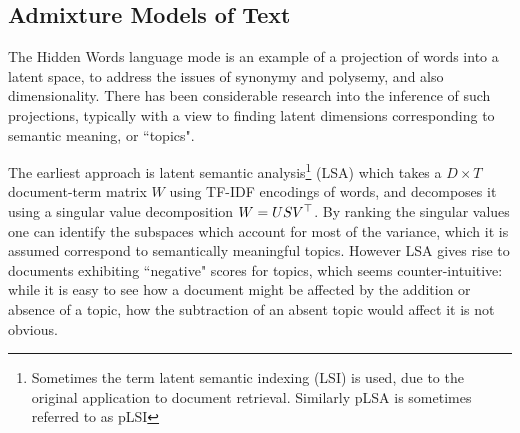 

\subsection{Admixture Models of Text}
The Hidden Words language mode is an example of a projection of words into a latent space, to address the issues of synonymy and polysemy, and also dimensionality. There has been considerable research into the inference of such projections, typically with a view to finding latent dimensions corresponding to semantic meaning, or ``topics".

The earliest approach is latent semantic analysis\footnote{Sometimes the term latent semantic indexing (LSI) is used, due to the original application to document retrieval. Similarly pLSA is sometimes referred to as pLSI} (LSA)\cite{Deerwester1990} which takes a $D\times T$ document-term matrix $W$ using TF-IDF encodings of words, and decomposes it using a singular value decomposition $W = USV^\top$. By ranking the singular values one can identify the subspaces which account for most of the variance, which it is assumed correspond to semantically meaningful topics. However LSA gives rise to documents exhibiting ``negative" scores for topics, which seems counter-intuitive: while it is easy to see how a document might be affected by the addition or absence of a topic, how the subtraction of an absent topic would affect it is not obvious.

